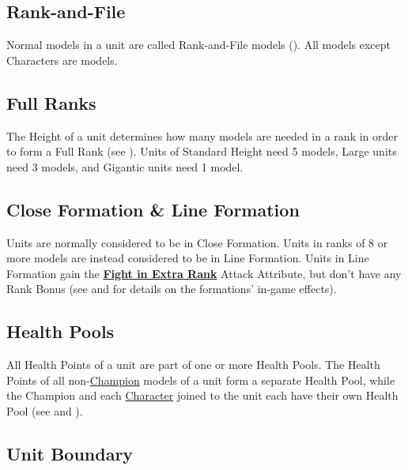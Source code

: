 \subsection{Rank-and-File}
\label{rank_and_file}

Normal models in a unit are called Rank-and-File models (\rnf{}). All models except Characters are \rnf{} models.

\subsection{Full Ranks}
\label{full_ranks}

The Height of a unit determines how many models are needed in a rank in order to form a Full Rank (see ). Units of Standard Height need 5 models, Large units need 3 models, and Gigantic units need 1 model.

\subsection{Close Formation \&{} Line Formation}
\label{line_formation}

Units are normally considered to be in Close Formation. Units in ranks of 8 or more models are instead considered to be in Line Formation. Units in Line Formation gain the \hyperref[fight_in_extra_rank]{\textbf{Fight in Extra Rank}} Attack Attribute, but don't have any Rank Bonus (see  and  for details on the formations' in-game effects).

\subsection{Health Pools}
\label{health_pools}

All Health Points of a unit are part of one or more Health Pools. The Health Points of all non-\hyperref[champion]{Champion} \rnf{} models of a unit form a separate Health Pool, while the Champion and each \hyperref[characters]{Character} joined to the unit each have their own Health Pool (see  and ).

\subsection{Unit Boundary}
\label{boundary_rectangle}

